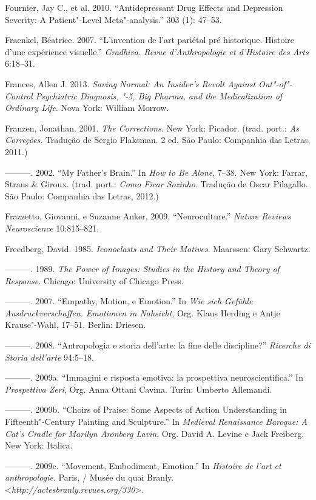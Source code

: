 Fournier, Jay C., et al. 2010. ``Antidepressant Drug Effects and
Depression Severity: A Patient"-Level Meta"-analysis.'' \emph{} 303
(1): 47--53.

Fraenkel, Béatrice. 2007. ``L'invention de l'art pariétal pré
historique. Histoire d'une expérience visuelle.'' \emph{Gradhiva. Revue
d'Anthropologie et d'Histoire des Arts} 6:18--31.

Frances, Allen J. 2013. \emph{Saving Normal: An Insider's Revolt Against
Out"-of"-Control Psychiatric Diagnosis, "-5, Big Pharma, and the
Medicalization of Ordinary Life}. Nova York: William Morrow.

Franzen, Jonathan. 2001. \emph{The Corrections}. New York: Picador.
(trad. port.: \emph{As Correções}. Tradução de Sergio Flaksman. 2 ed.
São Paulo: Companhia das Letras, 2011.)

---------. 2002. ``My Father's Brain.'' In \emph{How to Be Alone},
7--38. New York: Farrar, Straus \& Giroux. (trad. port.: \emph{Como
Ficar Sozinho}. Tradução de Oscar Pilagallo. São Paulo: Companhia das
Letras, 2012.)

Frazzetto, Giovanni, e Suzanne Anker. 2009. ``Neuroculture.''
\emph{Nature Reviews Neuroscience} 10:815--821.

Freedberg, David. 1985. \emph{Iconoclasts and Their Motives}. Maarssen:
Gary Schwartz.

---------. 1989. \emph{The Power of Images: Studies in the History and
Theory of Response}. Chicago: University of Chicago Press.

---------. 2007. ``Empathy, Motion, e Emotion.'' In \emph{Wie sich
Gefühle Ausdruckverschaffen. Emotionen in Nahsicht}, Org. Klaus Herding
e Antje Krause"-Wahl, 17--51. Berlin: Driesen.

---------. 2008. ``Antropologia e storia dell'arte: la fine delle
discipline?'' \emph{Ricerche di Storia dell'arte} 94:5--18.

---------. 2009a. ``Immagini e risposta emotiva: la prospettiva
neuroscientifica.'' In \emph{Prospettiva Zeri}, Org. Anna Ottani Cavina.
Turin: Umberto Allemandi.

---------. 2009b. ``Choirs of Praise: Some Aspects of Action
Understanding in Fifteenth"-Century Painting and Sculpture.'' In
\emph{Medieval Renaissance Baroque: A Cat's Cradle for Marilyn Aronberg
Lavin}, Org. David A. Levine e Jack Freiberg. New York: Italica.

---------. 2009c. ``Movement, Embodiment, Emotion.'' In \emph{Histoire
de l'art et anthropologie}. Paris,  / Musée du quai Branly.
\textless{}\emph{http://actesbranly.revues.org/330}\textgreater{}.

